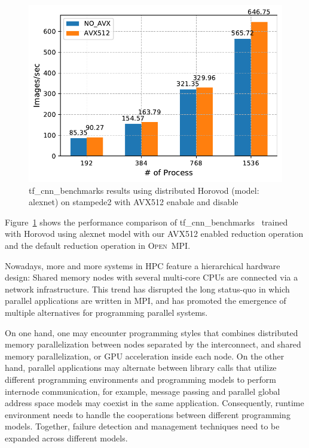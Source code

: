 \documentclass[sigconf]{acmart}
\newcommand{\ompi}[0]{\textsc{Open~MPI}\xspace}
\newcommand{\mpi}[0]{\textsc{MPI}\xspace}
\begin{document}
\begin{figure}[h]
    \centering
    \includegraphics[width=\linewidth]{horovod_tacc.pdf}
    \caption{tf\_cnn\_benchmarks results using distributed Horovod (model: alexnet) on stampede2 with AVX512 enabale and disable}
    \label{fig:horovod_tacc}
\end{figure}

Figure~\ref{fig:horovod_tacc} shows the performance comparison of tf\_cnn\_benchmarks~\cite{cnn_Tensorflow} trained with Horovod
using alexnet model with our AVX512 enabled reduction operation and the default reduction operation in \ompi.

Nowadays, more and more systems in HPC feature a hierarchical hardware design: Shared memory nodes
with several multi-core CPUs are connected via a network infrastructure. This trend has disrupted the long status-quo in which parallel applications are written in \mpi, and has promoted the emergence of multiple alternatives for programming parallel systems.

On one hand, one may encounter programming styles that combines distributed memory parallelization between nodes separated by the interconnect, and shared memory parallelization, or GPU acceleration inside each node. On the other hand, parallel applications may alternate between
library calls that utilize different programming environments and programming models
to perform internode communication, for example, message passing and parallel global address space models may coexist in the same application. Consequently,
runtime environment needs to handle the cooperations between different programming models. Together,
failure detection and management techniques need to be expanded across different models.
\end{document}

